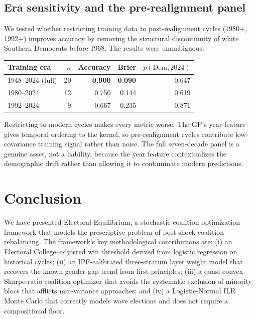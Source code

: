 \documentclass[12pt, letterpaper]{article}
\theoremstyle{definition}
\begin{document}
\subsection{Era sensitivity and the pre-realignment panel}

We tested whether restricting training data to post-realignment cycles
(1980+, 1992+) improves accuracy by removing the structural discontinuity
of white Southern Democrats before 1968. The results were unambiguous:

\begin{center}
\begin{tabular}{lrrrr}
\toprule
Training era & $n$ & Accuracy & Brier & $p(\text{Dem},2024)$ \\
\midrule
1948--2024 (full) & 20 & \textbf{0.900} & \textbf{0.090} & 0.647 \\
1980--2024 & 12 & 0.750 & 0.144 & 0.619 \\
1992--2024 & 9  & 0.667 & 0.235 & 0.871 \\
\bottomrule
\end{tabular}
\end{center}

Restricting to modern cycles makes every metric worse. The GP's year feature
gives temporal ordering to the kernel, so pre-realignment cycles contribute
low-covariance training signal rather than noise. The full seven-decade panel
is a genuine asset, not a liability, because the year feature contextualizes
the demographic drift rather than allowing it to contaminate modern predictions.

\section{Conclusion}
\label{sec:conclusion}

We have presented Electoral Equilibrium, a stochastic coalition optimization
framework that models the prescriptive problem of post-shock coalition rebalancing.
The framework's key methodological contributions are: (i) an Electoral
College--adjusted win threshold derived from logistic regression on historical
cycles; (ii) an IPF-calibrated three-stratum layer weight model that recovers
the known gender-gap trend from first principles; (iii) a quasi-convex Sharpe-ratio
coalition optimizer that avoids the systematic exclusion of minority blocs that
afflicts min-variance approaches; and (iv) a Logistic-Normal ILR Monte Carlo
that correctly models wave elections and does not require a compositional floor.
\end{document}
